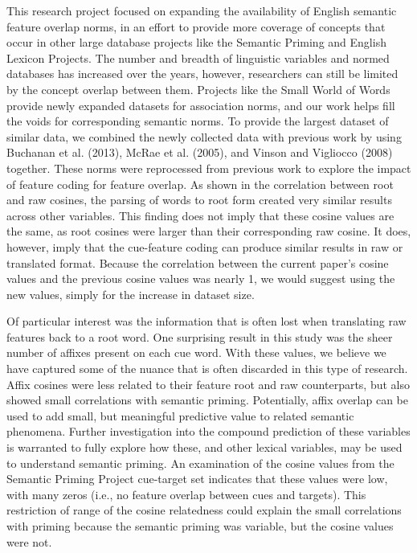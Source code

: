 \documentclass[english,,man]{apa6}
\theoremstyle{definition}
\theoremstyle{definition}
\theoremstyle{definition}
\theoremstyle{remark}
\begin{document}
This research project focused on expanding the availability of English
semantic feature overlap norms, in an effort to provide more coverage of
concepts that occur in other large database projects like the Semantic
Priming and English Lexicon Projects. The number and breadth of
linguistic variables and normed databases has increased over the years,
however, researchers can still be limited by the concept overlap between
them. Projects like the Small World of Words provide newly expanded
datasets for association norms, and our work helps fill the voids for
corresponding semantic norms. To provide the largest dataset of similar
data, we combined the newly collected data with previous work by using
Buchanan et al. (2013), McRae et al. (2005), and Vinson and Vigliocco
(2008) together. These norms were reprocessed from previous work to
explore the impact of feature coding for feature overlap. As shown in
the correlation between root and raw cosines, the parsing of words to
root form created very similar results across other variables. This
finding does not imply that these cosine values are the same, as root
cosines were larger than their corresponding raw cosine. It does,
however, imply that the cue-feature coding can produce similar results
in raw or translated format. Because the correlation between the current
paper's cosine values and the previous cosine values was nearly 1, we
would suggest using the new values, simply for the increase in dataset
size.

Of particular interest was the information that is often lost when
translating raw features back to a root word. One surprising result in
this study was the sheer number of affixes present on each cue word.
With these values, we believe we have captured some of the nuance that
is often discarded in this type of research. Affix cosines were less
related to their feature root and raw counterparts, but also showed
small correlations with semantic priming. Potentially, affix overlap can
be used to add small, but meaningful predictive value to related
semantic phenomena. Further investigation into the compound prediction
of these variables is warranted to fully explore how these, and other
lexical variables, may be used to understand semantic priming. An
examination of the cosine values from the Semantic Priming Project
cue-target set indicates that these values were low, with many zeros
(i.e., no feature overlap between cues and targets). This restriction of
range of the cosine relatedness could explain the small correlations
with priming because the semantic priming was variable, but the cosine
values were not.
\end{document}
